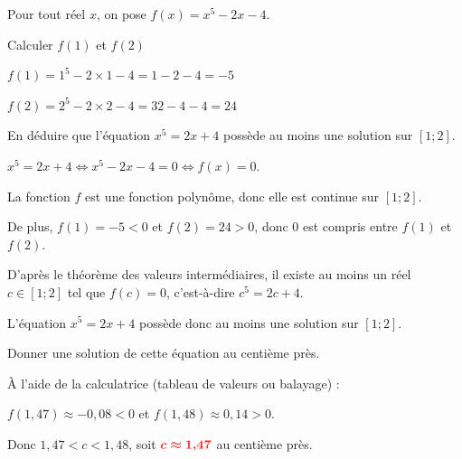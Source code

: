 \documentclass[11pt,a4paper]{article}  %
\begin{document}
	Pour tout réel $x$, on pose $f(x)=x^5-2 x-4$.
	\begin{enumMet}
		\item Calculer $f(1)$ et $f(2)$
		
		\begin{corrBox}
			$f(1)=1^5-2\times 1-4=1-2-4=-5$
			
			$f(2)=2^5-2\times 2-4=32-4-4=24$
		\end{corrBox}
		
		\item En déduire que l'équation $x^5=2 x+4$ possède au moins une solution sur $[1 ; 2]$.
		
		\begin{corrBox}
			$x^5=2x+4 \iff x^5-2x-4=0 \iff f(x)=0$.
			
			La fonction $f$ est une fonction polynôme, donc elle est continue sur $[1;2]$.
			
			De plus, $f(1)=-5<0$ et $f(2)=24>0$, donc $0$ est compris entre $f(1)$ et $f(2)$.
			
			D'après le théorème des valeurs intermédiaires, il existe au moins un réel $c \in[1 ; 2]$ tel que $f(c)=0$, c'est-à-dire $c^5=2c+4$.
			
			L'équation $x^5=2x+4$ possède donc au moins une solution sur $[1;2]$.
		\end{corrBox}
		
		\item Donner une solution de cette équation au centième près.
		
		\begin{corrBox}
			À l'aide de la calculatrice (tableau de valeurs ou balayage) :
			
			$f(1{,}47)\approx-0{,}08<0$ \quad et \quad $f(1{,}48)\approx 0{,}14>0$.
			
			Donc $1{,}47<c<1{,}48$, soit $\mRouge{c\approx 1{,}47}$ au centième près.
		\end{corrBox}
	\end{enumMet}
	
	\exerciceDS{}
	
\end{document}
